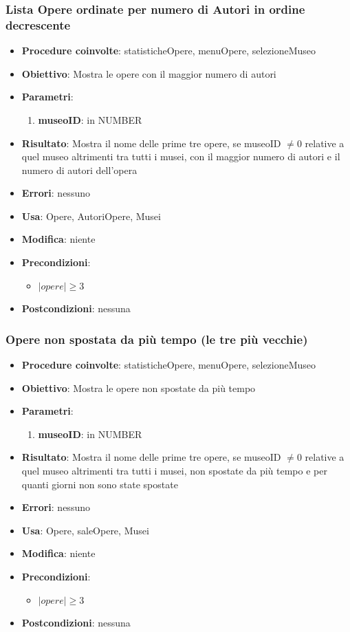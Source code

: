 \subsubsection{Lista Opere ordinate per numero di Autori in ordine decrescente}
\begin{itemize}
	\item \textbf{Procedure coinvolte}: statisticheOpere, menuOpere, selezioneMuseo
	\item \textbf{Obiettivo}: Mostra le opere con il maggior numero di autori
	\item \textbf{Parametri}:
	\begin{enumerate}
		\item \textbf{museoID}: in NUMBER
	\end{enumerate}
	\item \textbf{Risultato}: Mostra il nome delle prime tre opere, se museoID $\neq 0$ relative a quel museo altrimenti tra tutti i musei, con il maggior numero di autori e il numero di autori dell'opera
	\item \textbf{Errori}: nessuno
	\item \textbf{Usa}: Opere, AutoriOpere, Musei
	\item \textbf{Modifica}: niente
	\item \textbf{Precondizioni}:
	\begin{itemize}
		\item $|opere| \ge 3$
	\end{itemize}
	\item \textbf{Postcondizioni}: nessuna
\end{itemize}

\subsubsection{Opere non spostata da più tempo (le tre più vecchie)}
\begin{itemize}
	\item \textbf{Procedure coinvolte}: statisticheOpere, menuOpere, selezioneMuseo
	\item \textbf{Obiettivo}: Mostra le opere non spostate da più tempo
	\item \textbf{Parametri}:
	\begin{enumerate}
		\item \textbf{museoID}: in NUMBER
	\end{enumerate}
	\item \textbf{Risultato}: Mostra il nome delle prime tre opere, se museoID $\neq 0$ relative a quel museo altrimenti tra tutti i musei, non spostate da più tempo e per quanti giorni non sono state spostate
	\item \textbf{Errori}: nessuno
	\item \textbf{Usa}: Opere, saleOpere, Musei
	\item \textbf{Modifica}: niente
	\item \textbf{Precondizioni}:
	\begin{itemize}
		\item $|opere| \ge 3$
	\end{itemize}
	\item \textbf{Postcondizioni}: nessuna
\end{itemize}

